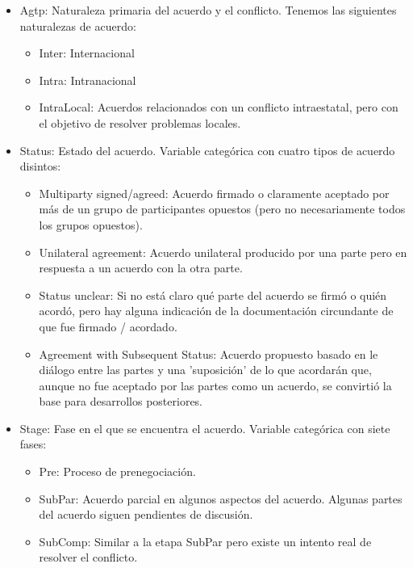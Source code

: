 \documentclass[11pt]{article}
\begin{document}
\begin{itemize}
    \item Agtp: Naturaleza primaria del acuerdo y el conflicto. Tenemos las siguientes naturalezas de acuerdo:
    \begin{itemize}
   \item Inter: Internacional

   \item Intra: Intranacional

   \item IntraLocal: Acuerdos relacionados con un conflicto intraestatal, pero con el objetivo de resolver problemas locales.

   \end{itemize}
   
    \item Status: Estado del acuerdo. Variable categórica con cuatro tipos de acuerdo disintos:
     \begin{itemize}
   \item Multiparty signed/agreed: Acuerdo firmado o claramente aceptado por más de un grupo de participantes opuestos (pero no necesariamente todos los grupos opuestos).
   
   \item Unilateral agreement: Acuerdo unilateral producido por una parte pero en respuesta a un acuerdo con la otra parte.

   \item Status unclear: Si no está claro qué parte del acuerdo se firmó o quién acordó, pero hay alguna indicación de la documentación circundante de que fue firmado / acordado.
   
   \item Agreement with Subsequent Status: Acuerdo propuesto basado en le diálogo entre las partes y una 'suposición' de lo que acordarán que, aunque no fue aceptado por las partes como un acuerdo, se convirtió la base para desarrollos posteriores.
   \end{itemize}
   
    \item Stage: Fase en el que se encuentra el acuerdo. Variable categórica con siete fases:
    \begin{itemize}
   \item Pre: Proceso de prenegociación.
   
   \item SubPar: Acuerdo parcial en algunos aspectos del acuerdo. Algunas partes del acuerdo siguen pendientes de discusión.

   \item SubComp: Similar a la etapa SubPar pero existe un intento real de resolver el conflicto.
   

\end{itemize}
\end{itemize}
\end{document}
